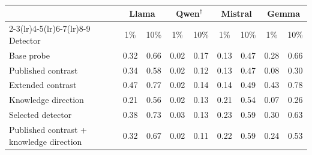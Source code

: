 \begin{tabular}{@{}l cc cc cc cc@{}}
\toprule
 & \multicolumn{2}{c}{Llama} & \multicolumn{2}{c}{Qwen$^\dagger$} & \multicolumn{2}{c}{Mistral} & \multicolumn{2}{c}{Gemma} \\
\cmidrule(lr){2-3}\cmidrule(lr){4-5}\cmidrule(lr){6-7}\cmidrule(lr){8-9}
Detector & 1\% & 10\% & 1\% & 10\% & 1\% & 10\% & 1\% & 10\% \\
\midrule
Base probe & 0.32 & 0.66 & 0.02 & 0.17 & 0.13 & 0.47 & 0.28 & 0.66 \\
Published contrast & 0.34 & 0.58 & 0.02 & 0.12 & 0.13 & 0.47 & 0.08 & 0.30 \\
Extended contrast & 0.47 & 0.77 & 0.02 & 0.14 & 0.14 & 0.49 & 0.43 & 0.78 \\
Knowledge direction & 0.21 & 0.56 & 0.02 & 0.13 & 0.21 & 0.54 & 0.07 & 0.26 \\
Selected detector & 0.38 & 0.73 & 0.03 & 0.13 & 0.23 & 0.59 & 0.30 & 0.63 \\
Published contrast + knowledge direction & 0.32 & 0.67 & 0.02 & 0.11 & 0.22 & 0.59 & 0.24 & 0.53 \\
\bottomrule
\end{tabular}
